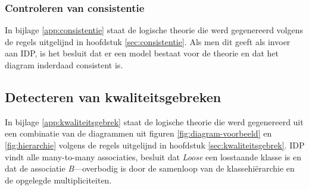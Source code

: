 \subsubsection{Controleren van consistentie}
In bijlage \ref{app:consistentie} staat de logische theorie die werd gegenereerd volgens de regels uitgelijnd in hoofdstuk \ref{sec:consistentie}. Als men dit geeft als invoer aan IDP, is het besluit dat er een model bestaat voor de theorie en dat het diagram inderdaad consistent is.

\subsection{Detecteren van kwaliteitsgebreken}
In bijlage \ref{app:kwaliteitsgebrek} staat de logische theorie die werd gegenereerd uit een combinatie van de diagrammen uit figuren \ref{fig:diagram-voorbeeld} en \ref{fig:hierarchie} volgens de regels uitgelijnd in hoofdstuk \ref{sec:kwaliteitsgebrek}. IDP vindt alle many-to-many associaties, besluit dat \textit{Loose} een losstaande klasse is en dat de associatie \textit{B}---\text overbodig is door de samenloop van de klassehi\"erarchie en de opgelegde multipliciteiten.